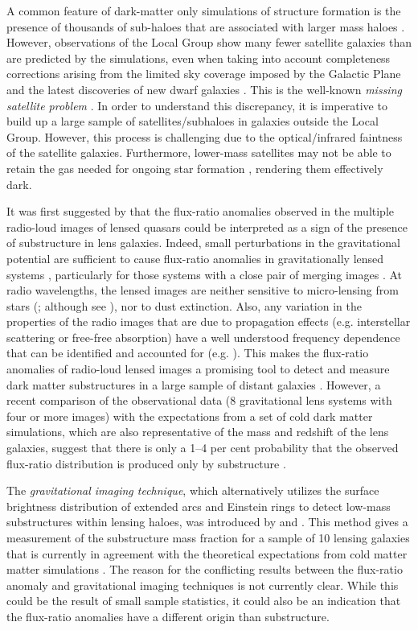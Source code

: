 \documentclass[a4paper,fleqn,usenatbib,useAMS]{mnras}
\begin{document}
A common feature of dark-matter only simulations of structure formation is the presence of thousands of sub-haloes that are associated with larger mass haloes \citep[e.g.][]{Springel08}. However, observations of the Local Group show many fewer satellite galaxies than are predicted by the simulations, even when taking into account completeness corrections arising from the limited sky coverage imposed by the Galactic Plane and the latest discoveries of new dwarf galaxies \citep{DES15,Kop15}.  
This is the well-known {\it missing satellite problem} \citep{Klypin1999,Moore1999,S07}. In order to understand this discrepancy, it is imperative to build up a large sample of satellites/subhaloes in galaxies outside the Local Group. However, this process is challenging due to the optical/infrared faintness of the satellite galaxies.  Furthermore, lower-mass satellites may not be able to retain the gas needed for ongoing star formation \citep[e.g.][]{P11}, rendering them effectively dark.  

It was first suggested by \citet{Mao1998} that the flux-ratio anomalies observed in the multiple radio-loud images of lensed quasars could be interpreted as a sign of the presence of substructure in lens galaxies. Indeed, small perturbations in the gravitational potential are sufficient to cause flux-ratio anomalies in gravitationally lensed systems \citep{metcalf01,Dalal2002,Bradac02}, particularly for those systems with a close pair of merging images \citep{KD04}. At radio wavelengths, the lensed images are neither sensitive to micro-lensing from stars (\citealt{K03}; although see \citealt{koopmans00}), nor to dust extinction. Also, any variation in the properties of the radio images that are due to propagation effects (e.g. interstellar scattering or free-free absorption) have a well understood frequency dependence that can be identified and accounted for (e.g. \citealt{biggs03,M07,winn04}). This makes the flux-ratio anomalies of radio-loud lensed images a promising tool to detect and measure dark matter substructures in a large sample of distant galaxies \citep{Dalal2002}. However, a recent comparison of the observational data (8 gravitational lens systems with four or more images) with the expectations from a set of cold dark matter simulations, which are also representative of the mass and redshift of the lens galaxies, suggest that there is only a 1--4 per cent probability that the observed flux-ratio distribution is produced only by substructure \citep{Xu14}.

The \emph{gravitational imaging technique}, which alternatively utilizes the surface brightness distribution of extended arcs and Einstein rings to detect low-mass substructures within lensing haloes, was introduced by \citet{K05} and \citet{V09}. This method gives a measurement of the substructure mass fraction for a sample of 10 lensing galaxies that is currently in agreement with the theoretical expectations from cold matter matter simulations \citep{V14a,V12}. The reason for the conflicting results between the flux-ratio anomaly and gravitational imaging techniques is not currently clear. While this could be the result of small sample statistics, it could also be an indication that the flux-ratio anomalies have a different origin than substructure. 
 
\end{document}
